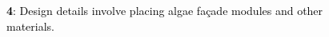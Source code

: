 ﻿%
\begin{figure}[H]
	\centering
	
	\vspace*{\baselineskip}%
	\caption*{%
		\footnotesize
		\textcolor{black}{%
			\textnormal{%
				\textbf{4}:
				Design details involve placing algae façade modules and other materials.
			}
		}
	}
	\label{
		fig:algae-bio-facade-system--features-04
	}
\end{figure}
